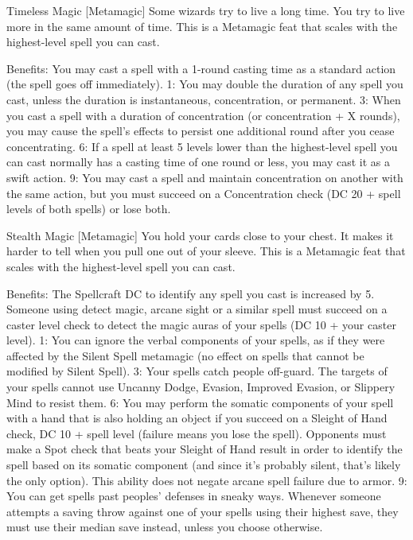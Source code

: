 Timeless Magic [Metamagic]
Some wizards try to live a long time. You try to live more in the same amount of time.
This is a Metamagic feat that scales with the highest-level spell you can cast.

Benefits: You may cast a spell with a 1-round casting time as a standard action (the spell goes off immediately).
1: You may double the duration of any spell you cast, unless the duration is instantaneous, concentration, or permanent.
3: When you cast a spell with a duration of concentration (or concentration + X rounds), you may cause the spell's effects to persist one additional round after you cease concentrating.
6: If a spell at least 5 levels lower than the highest-level spell you can cast normally has a casting time of one round or less, you may cast it as a swift action.
9: You may cast a spell and maintain concentration on another with the same action, but you must succeed on a Concentration check (DC 20 + spell levels of both spells) or lose both.


Stealth Magic [Metamagic]
You hold your cards close to your chest. It makes it harder to tell when you pull one out of your sleeve.
This is a Metamagic feat that scales with the highest-level spell you can cast.

Benefits: The Spellcraft DC to identify any spell you cast is increased by 5. Someone using detect magic, arcane sight or a similar spell must succeed on a caster level check to detect the magic auras of your spells (DC 10 + your caster level).
1: You can ignore the verbal components of your spells, as if they were affected by the Silent Spell metamagic (no effect on spells that cannot be modified by Silent Spell).
3: Your spells catch people off-guard. The targets of your spells cannot use Uncanny Dodge, Evasion, Improved Evasion, or Slippery Mind to resist them.
6: You may perform the somatic components of your spell with a hand that is also holding an object if you succeed on a Sleight of Hand check, DC 10 + spell level (failure means you lose the spell). Opponents must make a Spot check that beats your Sleight of Hand result in order to identify the spell based on its somatic component (and since it's probably silent, that's likely the only option). This ability does not negate arcane spell failure due to armor.
9: You can get spells past peoples' defenses in sneaky ways. Whenever someone attempts a saving throw against one of your spells using their highest save, they must use their median save instead, unless you choose otherwise.




